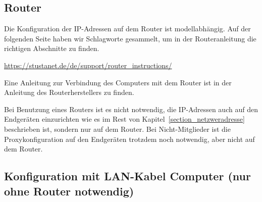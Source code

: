 \documentclass[a4paper,12pt]{scrartcl}
\begin{document}
\subsection{Router}
Die Konfiguration der IP-Adressen auf dem Router ist modellabhängig.
Auf der folgenden Seite haben wir Schlagworte gesammelt, um in der Routeranleitung die richtigen Abschnitte zu finden.

\url{https://stustanet.de/de/support/router_instructions/}

Eine Anleitung zur Verbindung des Computers mit dem Router ist in der Anleitung des Routerherstellers zu finden.

Bei Benutzung eines Routers ist es nicht notwendig, die IP-Adressen auch auf den Endgeräten einzurichten wie es im Rest von Kapitel~\ref{section_netzweradresse} beschrieben ist, sondern nur auf dem Router.
Bei Nicht-Mitglieder ist die Proxykonfiguration auf den Endgeräten trotzdem noch notwendig, aber nicht auf dem Router.

\subsection{Konfiguration mit LAN-Kabel Computer (nur ohne Router notwendig)}
\end{document}
